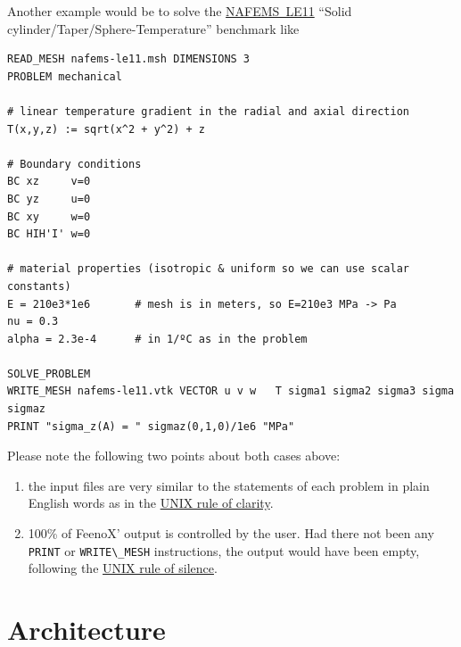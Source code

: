 \documentclass[
  american,
]{article}
\providecommand{\tightlist}{%
  \setlength{\itemsep}{0pt}\setlength{\parskip}{0pt}}
\begin{document}
Another example would be to solve the
\href{https://www.nafems.org/publications/resource_center/p18/}{NAFEMS~LE11}
``Solid cylinder/Taper/Sphere-Temperature'' benchmark like

\begin{lstlisting}[style=feenox]
READ_MESH nafems-le11.msh DIMENSIONS 3
PROBLEM mechanical

# linear temperature gradient in the radial and axial direction
T(x,y,z) := sqrt(x^2 + y^2) + z

# Boundary conditions
BC xz     v=0
BC yz     u=0
BC xy     w=0
BC HIH'I' w=0

# material properties (isotropic & uniform so we can use scalar constants)
E = 210e3*1e6       # mesh is in meters, so E=210e3 MPa -> Pa
nu = 0.3
alpha = 2.3e-4      # in 1/ºC as in the problem

SOLVE_PROBLEM
WRITE_MESH nafems-le11.vtk VECTOR u v w   T sigma1 sigma2 sigma3 sigma sigmaz
PRINT "sigma_z(A) = " sigmaz(0,1,0)/1e6 "MPa"
\end{lstlisting}

Please note the following two points about both cases above:

\begin{enumerate}
\def\labelenumi{\arabic{enumi}.}
\tightlist
\item
  the input files are very similar to the statements of each problem in
  plain English words as in the
  \href{http://catb.org/~esr/writings/taoup/html/ch01s06.html}{UNIX rule
  of clarity}.
\item
  100\% of FeenoX' output is controlled by the user. Had there not been
  any \passthrough{\lstinline!PRINT!} or
  \passthrough{\lstinline!WRITE\_MESH!} instructions, the output would
  have been empty, following the
  \href{http://catb.org/~esr/writings/taoup/html/ch01s06.html}{UNIX rule
  of silence}.
\end{enumerate}

\hypertarget{sec:architecture}{%
\section{Architecture}\label{sec:architecture}}
\end{document}
